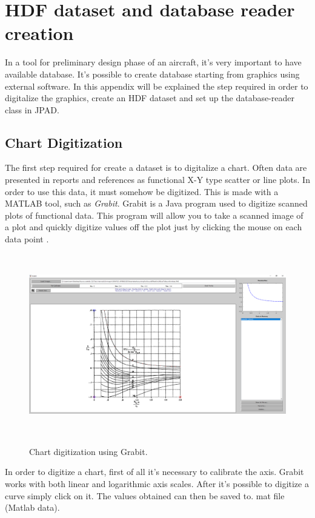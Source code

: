 
\chapter{HDF dataset and database reader creation}
\label{ch:hdigitalizer}
In a tool for preliminary design phase of an aircraft, it's very important to have available database. It's possible to create database starting from graphics using external software. In this appendix will be explained the step required in order to digitalize the graphics, create an HDF dataset and set up the database-reader class in JPAD.

\section{Chart Digitization}
The first step required for create a dataset is to digitalize a chart. Often data are presented in reports and references as functional X-Y type scatter or line plots. In order to use this data, it must somehow be digitized. This is made with a MATLAB tool, such as {\itshape Grabit}. Grabit is a Java program used to digitize scanned plots of functional data. This program will allow you to take a scanned image of a plot and quickly digitize values off the plot just by clicking the mouse on each data point \cite{Grabit}.

\begin{figure}[htbp]
\centering
{\includegraphics[height=7.9cm]{Immagini/AppendiceA/Grabit.png}} 
\caption{Chart digitization using Grabit.}
\label{angles}
\end{figure} 


In order to digitize a chart, first of all it's necessary to calibrate the axis. Grabit works with both linear and logarithmic axis scales. After it's possible to digitize a curve simply click on it. The values obtained can then be saved to. mat file (Matlab data).


